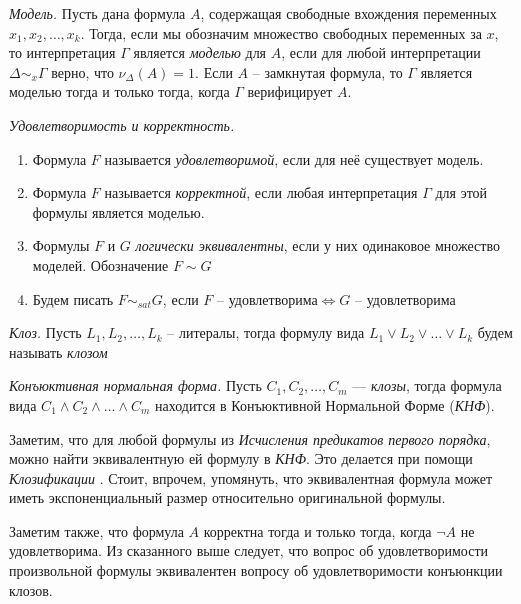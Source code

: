 \begin{definition}
  \emph{Модель.} Пусть дана формула $A$, содержащая свободные вхождения переменных $x_1, x_2, \ldots, x_k$. Тогда, если мы обозначим множество свободных переменных за $x$, то интерпретация $\Gamma$ является \textit{моделью} для $A$, если для любой интерпретации $\Delta \sim_x \Gamma$ верно, что $\nu_{\Delta}(A) = 1$. Если $A$ -- замкнутая формула, то $\Gamma$ является моделью тогда и только тогда, когда $\Gamma$ верифицирует $A$.
\end{definition}

\begin{definition}
  \emph{Удовлетворимость и корректность.} 
  \begin{enumerate}
  	\item Формула $F$ называется \textit{удовлетворимой}, если для неё существует модель.
  	\item Формула $F$ называется \textit{корректной}, если любая интерпретация $\Gamma$ для этой формулы является моделью.
  	\item Формулы $F$ и $G$ \textit{логически эквивалентны}, если у них одинаковое множество моделей. Обозначение $F \sim G$
  	\item Будем писать $F \sim_{sat} G$, если $F \text{ -- удовлетворима} \iff G \text{ -- удовлетворима}$
  \end{enumerate}
\end{definition}

\begin{definition}
  \emph{Клоз.} Пусть $L_1, L_2, \ldots, L_k$ -- литералы, тогда формулу вида $L_1 \vee L_2 \vee \dots \vee L_k$ будем называть \emph{клозом}
\end{definition}

\begin{definition}
  \emph{Конъюктивная нормальная форма.} Пусть $C_1, C_2, \ldots, C_m$ --- \emph{клозы}, тогда формула вида $C_1 \wedge C_2 \wedge \dots \wedge C_m$ находится в Конъюктивной Нормальной Форме (\emph{КНФ}).
\end{definition}

Заметим, что для любой формулы из \emph{Исчисления предикатов первого порядка}, можно найти эквивалентную ей формулу в \emph{КНФ}. Это делается при помощи \textit{Клозификации} \cite{clausification}. Стоит, впрочем, упомянуть, что эквивалентная формула может иметь экспоненциальный размер относительно оригинальной формулы.

Заметим также, что формула $A$ корректна тогда и только тогда, когда $\neg A$ не удовлетворима. Из сказанного выше следует, что вопрос об удовлетворимости произвольной формулы эквивалентен вопросу об удовлетворимости конъюнкции клозов. 

